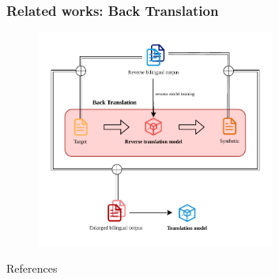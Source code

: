 \documentclass[]{beamer} %
\newcommand{\backupend}{
    \addtocounter{framenumberappendix}{-\value{framenumber}}
    \addtocounter{framenumber}{\value{framenumberappendix}} 
}
\begin{document}
\section{}
\frame
{\frametitle{Related works: Back Translation}


\begin{figure}
  \centering
  \includegraphics[width=0.7\textwidth, keepaspectratio]{figure/BT/backtranslation.pdf}
  \caption{\citep{sennrich-etal-2016-improving}}
\end{figure} 
} 

\begin{frame}[allowframebreaks]{References}

\renewcommand{\bibname}{References}
\small



\end{frame}


\backupend
\end{document}
